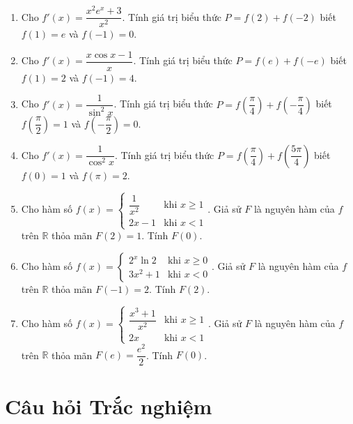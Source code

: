 \documentclass[12pt]{article}
\begin{document}
	\begin{btdo}
		\begin{enumerate}[label=\alph*), resume]
			\item Cho $f'(x) = \dfrac{x^2 e^x + 3}{x^2}$. Tính giá trị biểu thức $P = f(2) + f(-2)$ biết $f(1) = e$ và $f(-1) = 0$.
			\item Cho $f'(x) = \dfrac{x \cos x - 1}{x}$. Tính giá trị biểu thức $P = f(e) + f(-e)$ biết $f(1) = 2$ và $f(-1) = 4$.
			\item Cho $f'(x) = \dfrac{1}{\sin^2 x}$. Tính giá trị biểu thức $P = f\left(\dfrac{\pi}{4}\right) + f\left(-\dfrac{\pi}{4}\right)$ biết $f\left(\dfrac{\pi}{2}\right) = 1$ và $f\left(-\dfrac{\pi}{2}\right) = 0$.
			\item Cho $f'(x) = \dfrac{1}{\cos^2 x}$. Tính giá trị biểu thức $P = f\left(\dfrac{\pi}{4}\right) + f\left(\dfrac{5\pi}{4}\right)$ biết $f(0) = 1$ và $f(\pi) = 2$.
			\item Cho hàm số $f(x) = \begin{cases} \dfrac{1}{x^2} & \text{khi } x \ge 1 \\ 2x - 1 & \text{khi } x < 1 \end{cases}$. Giả sử $F$ là nguyên hàm của $f$ trên $\mathbb{R}$ thỏa mãn $F(2) = 1$. Tính $F(0)$.
			\item Cho hàm số $f(x) = \begin{cases} 2^x \ln 2 & \text{khi } x \ge 0 \\ 3x^2 + 1 & \text{khi } x < 0 \end{cases}$. Giả sử $F$ là nguyên hàm của $f$ trên $\mathbb{R}$ thỏa mãn $F(-1) = 2$. Tính $F(2)$.
			\item Cho hàm số $f(x) = \begin{cases} \dfrac{x^3 + 1}{x^2} & \text{khi } x \ge 1 \\ 2x & \text{khi } x < 1 \end{cases}$. Giả sử $F$ là nguyên hàm của $f$ trên $\mathbb{R}$ thỏa mãn $F(e) = \dfrac{e^2}{2}$. Tính $F(0)$.
		\end{enumerate}
	\end{btdo}
	\newpage
	
	\section{Câu hỏi Trắc nghiệm}
	
\end{document}
